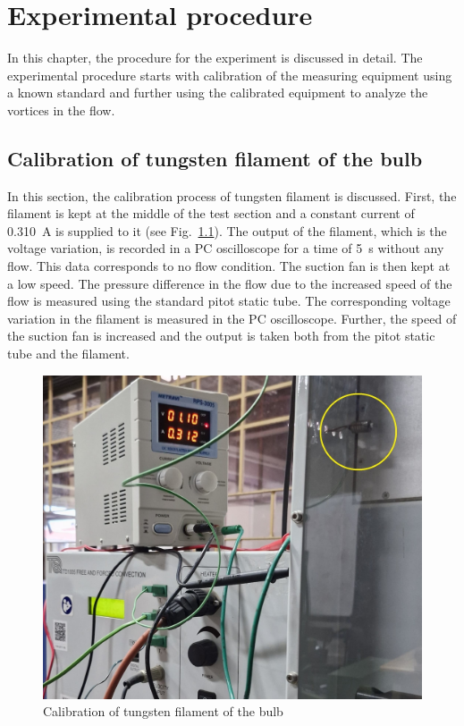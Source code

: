 \chapter{Experimental procedure}\label{ch:procedure}
In this chapter, the procedure for the experiment is discussed in detail. The experimental procedure starts with calibration of the measuring equipment using a known standard and further using the calibrated equipment to analyze the vortices in the flow.

\section{Calibration of tungsten filament of the bulb}\label{sec:calib bulb}

In this section, the calibration process of tungsten filament is discussed. First, the filament is kept at the middle of the test section and a constant current of 0.310~A is supplied to it (see Fig.~\ref{fig:calibration of filament}). The output of the filament, which is the voltage variation, is recorded in a PC oscilloscope for a time of 5~s without any flow. This data corresponds to no flow condition. The suction fan is then kept at a low speed. The pressure difference in the flow due to the increased speed of the flow is measured using the standard pitot static tube. The corresponding voltage variation in the filament is measured in the PC oscilloscope. Further, the speed of the suction fan is increased and the output is taken both from the pitot static tube and the filament. 
\begin{figure}[H]
    \centering
    \includegraphics[width=0.7\linewidth]{gfx/TFB_Calibration.jpeg}
    \caption{Calibration of tungsten filament of the bulb}
    \label{fig:calibration of filament}
\end{figure}
